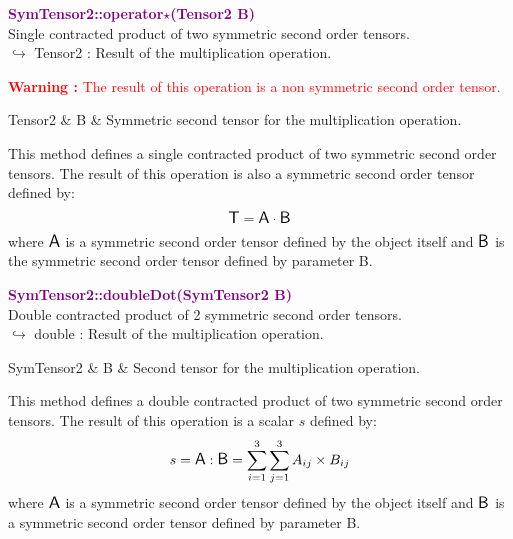 \textcolor{purple}{\textbf{SymTensor2::operator$\star$(Tensor2 B)}}\label{SymTensor2::operator*(Tensor2 B)}\\
Single contracted product of two symmetric second order tensors.\\ \hspace*{10mm}$\hookrightarrow$ Tensor2 : Result of the multiplication operation.

\hspace*{10mm}\textcolor{red}{\textbf{Warning :}  The result of this operation is a non symmetric second order tensor.}

\begin{tcolorbox}[width=\textwidth,myArgs,tabularx={ll|R}]
Tensor2 & B & Symmetric second tensor for the multiplication operation.
\end{tcolorbox}

This method defines a single contracted product of two symmetric second order tensors.
The result of this operation is also a symmetric second order tensor defined by:
\begin{equation*}
\mbox{\large\ensuremath{\mathsf{T}}} = \mbox{\large\ensuremath{\mathsf{A}}} \cdot \mbox{\large\ensuremath{\mathsf{B}}}
\end{equation*}
where $\mbox{\large\ensuremath{\mathsf{A}}}$ is a symmetric second order tensor defined by the object itself and $\mbox{\large\ensuremath{\mathsf{B}}}$ is the symmetric second order tensor defined by parameter B.

\textcolor{purple}{\textbf{SymTensor2::doubleDot(SymTensor2 B)}}\label{SymTensor2::doubleDot(SymTensor2 B)}\\
Double contracted product of 2 symmetric second order tensors.\\ \hspace*{10mm}$\hookrightarrow$ double : Result of the multiplication operation.

\begin{tcolorbox}[width=\textwidth,myArgs,tabularx={ll|R}]
SymTensor2 & B & Second tensor for the multiplication operation.
\end{tcolorbox}

This method defines a double contracted product of two symmetric second order tensors.
The result of this operation is a scalar $s$ defined by:
\begin{equation*}
s = \mbox{\large\ensuremath{\mathsf{A}}} : \mbox{\large\ensuremath{\mathsf{B}}} = \sum_{i=1}^{3} \sum_{j=1}^{3} A_{ij}\times B_{ij}
\end{equation*}
where $\mbox{\large\ensuremath{\mathsf{A}}}$ is a symmetric second order tensor defined by the object itself and $\mbox{\large\ensuremath{\mathsf{B}}}$ is a symmetric second order tensor defined by parameter B.

